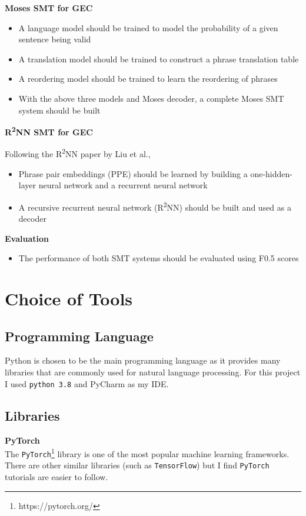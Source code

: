 \documentclass[12pt,a4paper,twoside,openright]{report}
\begin{document}
\textbf{Moses SMT for GEC}
\begin{itemize}
    \item A language model should be trained to model the probability of a given sentence being valid
    \item A translation model should be trained to construct a phrase translation table
    \item A reordering model should be trained to learn the reordering of phrases
    \item With the above three models and Moses decoder, a complete Moses SMT system should be built
\end{itemize}

\textbf{R\textsuperscript{2}NN SMT for GEC}

Following the R\textsuperscript{2}NN paper by Liu et al.\cite{r2nn},
\begin{itemize}
    \item Phrase pair embeddings (PPE) should be learned by building a one-hidden-layer neural network and a recurrent neural network
    \item A recursive recurrent neural network (R\textsuperscript{2}NN) should be built and used as a decoder
\end{itemize}

\textbf{Evaluation}
\begin{itemize}
    \item The performance of both SMT systems should be evaluated using F0.5 scores
\end{itemize}

\section{Choice of Tools}\label{section:tools}

\subsection{Programming Language}
Python is chosen to be the main programming language as it provides many libraries that are commonly used for natural language processing. For this project I used \texttt{python 3.8} and PyCharm as my IDE.

\subsection{Libraries}
\textbf{PyTorch} \\
The \texttt{PyTorch}\footnote{https://pytorch.org/} library is one of the most popular machine learning frameworks. There are other similar libraries (such as \texttt{TensorFlow}) but I find \texttt{PyTorch} tutorials are easier to follow.
\end{document}
